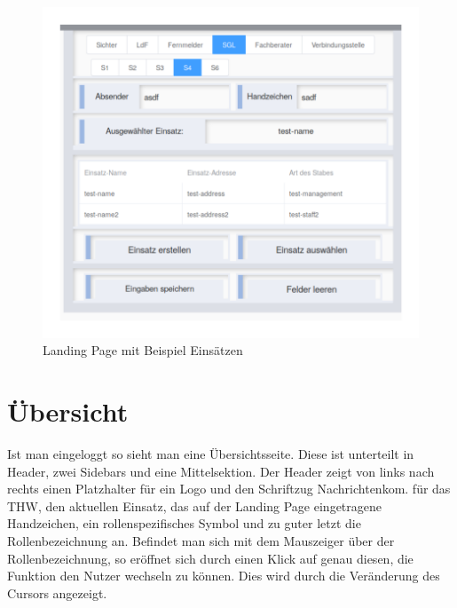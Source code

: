 \documentclass[a4paper,11pt,oneside, titlepage]{article}
\begin{document}
	\begin{figure}[htpb]
		\centering
		\includegraphics[width=0.8\linewidth]{lPage}
		\caption{Landing Page mit Beispiel Einsätzen}
	\end{figure}
	\newpage
	
	\section{Übersicht}
	Ist man eingeloggt so sieht man eine Übersichtsseite. Diese ist unterteilt in Header, zwei Sidebars und eine Mittelsektion.
	Der Header zeigt von links nach rechts einen Platzhalter für ein Logo und den Schriftzug \glqq{} Nachrichtenkom. für das THW\grqq{}, den aktuellen Einsatz, das auf der Landing Page eingetragene Handzeichen, ein rollenspezifisches Symbol und zu guter letzt die Rollenbezeichnung an. 
	Befindet man sich mit dem Mauszeiger über der Rollenbezeichnung, so eröffnet sich durch einen Klick auf genau diesen, die Funktion den Nutzer wechseln zu können. Dies wird durch die Veränderung des Cursors angezeigt.
		
\end{document}

